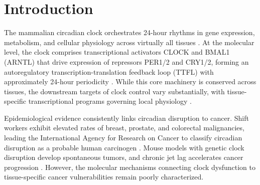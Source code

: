 \documentclass[11pt,letterpaper]{article}
\begin{document}
\begin{abstract}
\noindent\textbf{Conclusions:} PAR(2) provides a permutation-tested discovery framework establishing Wee1 as the broadly conserved circadian checkpoint target, challenging the assumed primacy of Myc, and revealing temporal memory organized along functional lines. The eigenvalue modulus $|\lambda|$ is a biologically informative metric distinct from expression level or variance, with direct implications for chronotherapy target prioritization and ongoing Wee1 inhibitor trials.

\noindent\textbf{Keywords:} circadian rhythm, Wee1, autoregressive model, eigenvalue modulus, temporal persistence, cancer, tissue-specific gating, chronotherapy, root-space geometry, gene expression memory
\end{abstract}

\newpage

\section{Introduction}

The mammalian circadian clock orchestrates 24-hour rhythms in gene expression, metabolism, and cellular physiology across virtually all tissues \citep{takahashi2017}. At the molecular level, the clock comprises transcriptional activators CLOCK and BMAL1 (ARNTL) that drive expression of repressors PER1/2 and CRY1/2, forming an autoregulatory transcription-translation feedback loop (TTFL) with approximately 24-hour periodicity \citep{reppert2002}. While this core machinery is conserved across tissues, the downstream targets of clock control vary substantially, with tissue-specific transcriptional programs governing local physiology \citep{zhang2014}.

Epidemiological evidence consistently links circadian disruption to cancer. Shift workers exhibit elevated rates of breast, prostate, and colorectal malignancies, leading the International Agency for Research on Cancer to classify circadian disruption as a probable human carcinogen \citep{straif2007}. Mouse models with genetic clock disruption develop spontaneous tumors, and chronic jet lag accelerates cancer progression \citep{fu2002}. However, the molecular mechanisms connecting clock dysfunction to tissue-specific cancer vulnerabilities remain poorly characterized.
\end{document}
